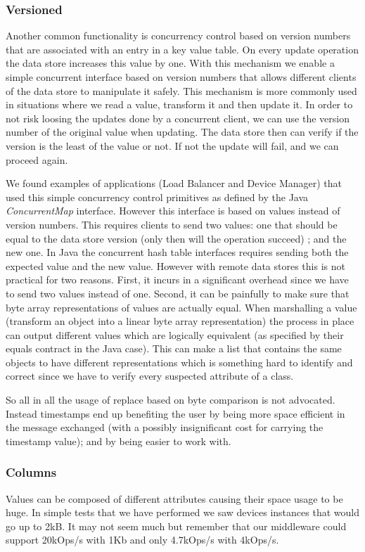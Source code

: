 \subsubsection {Versioned}
Another common functionality is concurrency control based on version numbers that are associated with an entry in a key value table. 
On every update operation the data store increases this value by one.
With this mechanism we enable a simple concurrent interface based on version numbers that allows different clients of the data store to manipulate it safely. 
This mechanism is more commonly used in situations where we read a value, transform it and then update it. In order to not risk loosing the updates done by a concurrent client, we can use the version number of the original value when updating. The data store then can verify if the version is the least of the value or not. If not the update will fail, and we can proceed again.  

We found examples of applications (Load Balancer and Device Manager) that used this simple concurrency control primitives as defined by the Java \emph{ConcurrentMap} interface. However this interface is based on values instead of version numbers. This requires clients to send two values: one that should be equal to the data store version (only then will the operation succeed)  ; and the new one. 
In Java the concurrent hash table interfaces requires sending both the expected value and the new value. 
However with remote data stores this is not practical for two reasons. 
First, it incurs in a significant overhead since we have to send two values instead of one.
Second, it can be painfully to make sure that byte array representations of values are actually equal. When marshalling a value (transform an object into a linear byte array representation) the process in place can output different values which are logically equivalent (as specified by their equals contract in the Java case).  This can make a list that contains the same objects to have different representations which is something hard to identify and correct since we have to verify every suspected attribute of a class. 

So all in all the usage of replace based on byte comparison is not advocated. Instead timestamps end up benefiting the user by being more space efficient in the message exchanged (with a possibly insignificant cost for carrying the timestamp value); and by being easier to work with. 

\subsubsection{Columns}
Values can be composed of different attributes causing their space usage to be huge. In simple tests that we have performed we saw devices instances that would go up to 2kB. It may not seem much but remember that our middleware could support 20kOps/s with 1Kb and only 4.7kOps/s with 4kOps/s. 

